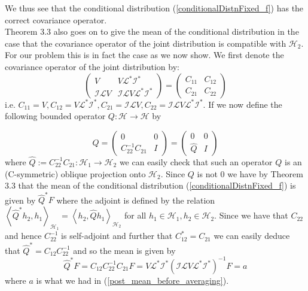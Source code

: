 We thus see that the conditional distribution (\ref{conditionalDistnFixed_f}) has the correct covariance operator. \\

Theorem 3.3 also goes on to give the mean of the conditional distribution in the case that the covariance operator of the joint distribution is compatible with $\mathcal{H}_{2}$. For our problem this is in fact the case as we now show. We first denote the covariance operator of the joint distribution by:
\begin{equation}
    \begin{pmatrix}
        V & V\mathcal{L}^{*}\mathcal{I}^{*} \\
        \mathcal{I}\mathcal{L}V & \mathcal{I}\mathcal{L}V\mathcal{L}^{*}\mathcal{I}^{*}
    \end{pmatrix}=
    \begin{pmatrix}
        C_{11} & C_{12} \\
        C_{21} & C_{22}
    \end{pmatrix}
\end{equation}
i.e. $C_{11}=V, C_{12}=V\mathcal{L}^{*}\mathcal{I}^{*}, C_{21}=\mathcal{I}\mathcal{L}V, C_{22}=\mathcal{I}\mathcal{L}V\mathcal{L}^{*}\mathcal{I}^{*}$. If we now define the following bounded operator $Q:\mathcal{H}\rightarrow\mathcal{H}$ by

\begin{equation}
    Q = \begin{pmatrix}
            0 & 0 \\
            C_{22}^{-1}C_{21} & I
        \end{pmatrix} = \begin{pmatrix}
                            0 & 0 \\
                            \hat{Q} & I
                        \end{pmatrix}
\end{equation}
where $\hat{Q}:=C_{22}^{-1}C_{21}:\mathcal{H}_{1}\rightarrow\mathcal{H}_{2}$ we can easily check that such an operator $Q$ is an (C-symmetric) oblique projection onto $\mathcal{H}_{2}$. Since $Q$ is not $0$ we have by Theorem 3.3 that the mean of the conditional distribution (\ref{conditionalDistnFixed_f}) is given by $\hat{Q}^{*}F$ where the adjoint is defined by the relation $\left\langle\hat{Q}^{*} h_{2}, h_{1}\right\rangle_{\mathcal{H}_{1}}=\left\langle h_{2}, \hat{Q} h_{1}\right\rangle_{\mathcal{H}_{2}}$ for all $h_1\in\mathcal{H}_1,h_{2}\in\mathcal{H}_{2}$. Since we have that $C_{22}$ and hence $C_{22}^{-1}$ is self-adjoint and further that $C_{12}^{*}=C_{21}$ we can easily deduce that $\hat{Q}^{*}=C_{12}C_{22}^{-1}$ and so the mean is given by
\begin{equation}
    \hat{Q}^{*}F=C_{12}C_{22}^{-1}C_{21}F=V\mathcal{L}^{*}\mathcal{I}^{*}(\mathcal{I}\mathcal{L}V\mathcal{L}^{*}\mathcal{I}^{*})^{-1}F=a
\end{equation}
where $a$ is what we had in (\ref{post_mean_before_averaging}). \\

